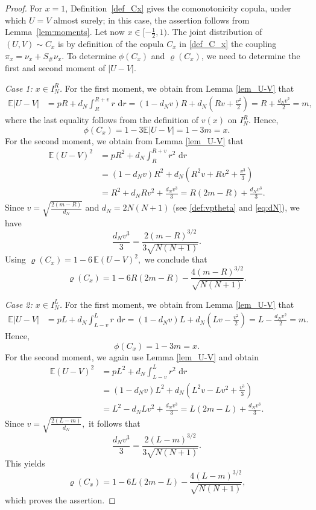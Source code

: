 \documentclass{article}
\newcommand{\de}{\mathrm{\,d}}
\newcommand{\E}{\mathbb{E}}
\begin{document}
\begin{proof}
For \(x=1\), Definition~\ref{def_Cx} gives the comonotonicity copula, under which \(U=V\) almost surely; in this case, the assertion follows from Lemma~\ref{lem:moments}.
Let now \(x\in[-\tfrac12,1)\).
The joint distribution of \((U,V)\sim C_x\) is by definition of the copula \(C_x\) in \eqref{def_C_x} the coupling \(\pi_x=\nu_x+S_\#\nu_x\).
To determine \(\phi(C_x)\) and \(\varrho(C_x)\), we need to determine the first and second moment of \(|U-V|\).

\medskip
\noindent
\emph{Case 1: \(x\in I_N^R\).}
For the first moment, we obtain from Lemma \ref{lem_U-V} that
\begin{align*}
    \E|U-V|
    &=
    pR+d_N\int_R^{R+v}r\,\de r
    =
    (1-d_Nv)R
    +
    d_N\left(Rv+\frac{v^2}{2}\right)
    =
    R+\frac{d_Nv^2}{2}
    =
    m,
\end{align*}
where the last equality follows from the definition of \(v(x)\) on \(I_N^R\).
Hence,
\[
    \phi(C_x)
    =
    1-3\E|U-V|
    =
    1-3m
    =
    x.
\]
For the second moment, we obtain from Lemma \ref{lem_U-V} that
\begin{align*}
    \E(U-V)^2
    &=
    pR^2+d_N\int_R^{R+v}r^2\,\de r\\
    &=
    (1-d_Nv)R^2
    +
    d_N\left(
        R^2v+Rv^2+\frac{v^3}{3}
    \right)\\
    &=
    R^2+d_NR v^2+\frac{d_Nv^3}{3}
    =
    R(2m-R)+\frac{d_Nv^3}{3}.
\end{align*}
Since \(v=\sqrt{\frac{2(m-R)}{d_N}} \) and \(d_N=2N(N+1)\) (see \eqref{def:vptheta} and \eqref{eq:dN}), we have
\[
    \frac{d_Nv^3}{3}
    =
    \frac{2(m-R)^{3/2}}
         {3\sqrt{N(N+1)}}.
\]
Using
\(
    \varrho(C_x)=1-6\,\E(U-V)^2,
\)
we conclude that
\[
    \varrho(C_x)
    =
    1-6R(2m-R)
    -
    \frac{4(m-R)^{3/2}}{\sqrt{N(N+1)}}.
\]

\medskip
\noindent
\emph{Case 2: \(x\in I_N^L\).}
For the first moment, we obtain from Lemma \ref{lem_U-V} that
\begin{align*}
    \E|U-V|
    &=
    pL+d_N\int_{L-v}^{L}r\,\de r
    =
    (1-d_Nv)L
    +
    d_N\left(Lv-\frac{v^2}{2}\right)
    =
    L-\frac{d_Nv^2}{2}
    =
    m.
\end{align*}
Hence,
\[
    \phi(C_x)=1-3m=x.
\]
For the second moment, we again use Lemma \ref{lem_U-V} and obtain
\begin{align*}
    \E(U-V)^2
    &=
    pL^2+d_N\int_{L-v}^{L}r^2\,\de r\\
    &=
    (1-d_Nv)L^2
    +
    d_N\left(
        L^2v-Lv^2+\frac{v^3}{3}
    \right)\\
    &=
    L^2-d_NL v^2+\frac{d_Nv^3}{3}
    =
    L(2m-L)+\frac{d_Nv^3}{3}.
\end{align*}
Since \(v=\sqrt{\frac{2(L-m)}{d_N}}, \) it follows that
\[
    \frac{d_Nv^3}{3}
    =
    \frac{2(L-m)^{3/2}}
         {3\sqrt{N(N+1)}}.
\]
This yields
\[
    \varrho(C_x)
    =
    1-6L(2m-L)
    -
    \frac{4(L-m)^{3/2}}{\sqrt{N(N+1)}},
\]
which proves the assertion.

\end{proof}
\end{document}
